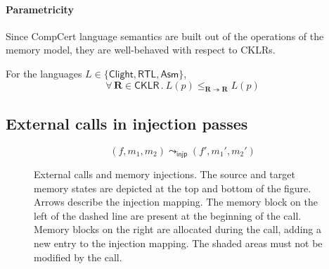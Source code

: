 \documentclass[sigplan,screen]{acmart}
\newcommand{\figsize}{\small}
\newcommand{\kw}[1]{\ensuremath{ \mathsf{#1} }}
\newcommand{\filltint}{!40}
\begin{document}

\paragraph{Parametricity} %

Since CompCert language semantics
are built out of the operations of the memory model,
they are well-behaved with respect to CKLRs.

\begin{theorem}%
\label{thm:param}
For the languages $L \in \{\kw{Clight}, \kw{RTL}, \kw{Asm}\}$,
\[
    \forall \, \mathbf{R} \in \kw{CKLR} \,.\:
      L(p)
        \le_{\mathbf{R} \twoheadrightarrow \mathbf{R}}
      L(p)
\]
\end{theorem}



\subsection{External calls in injection passes} \label{sec:injp} %

\begin{figure} %
  \[ (f, m_1, m_2) \leadsto_\kw{injp} (f', m_1', m_2') \]
  \caption{External calls and memory injections.
    The source and target memory states are
    depicted at the top and bottom
    of the figure. Arrows describe the injection mapping.
    The memory block on the left of the dashed line
    are present at the beginning of the call.
    Memory blocks on the right
    are allocated during the call,
    adding a new entry to the injection mapping.
    The shaded areas must not be modified by the call.
  }
  \label{fig:injp}
\end{figure}
\end{document}
